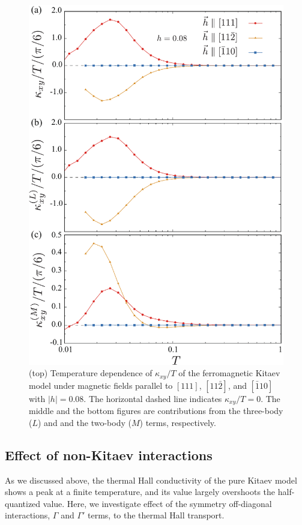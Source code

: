 \documentclass[reprint,amsmath,amssymb,aps,prx]{revtex4-2}
\begin{document}
\begin{figure}
  \begin{center}
    \includegraphics[width=0.9\linewidth]{Figs/plot_k_all_h0.08_ab.pdf}
  \end{center}
  \caption{(top) Temperature dependence of $\kappa_{xy}/T$ of the ferromagnetic Kitaev model under magnetic fields parallel to $[111]$, $[11\bar{2}]$, and $[\bar{1}10]$ with $|h|=0.08$. The horizontal dashed line indicates $\kappa_{xy}/T = 0$. The middle and the bottom figures are contributions from the three-body ($L$) and and the two-body ($M$) terms, respectively.}
  \label{fig:k_all_h0.08_ab}
\end{figure}
  \subsection{Effect of non-Kitaev interactions}
   As we discussed above, the thermal Hall conductivity of the pure Kitaev model shows a peak at a finite temperature, and its value largely overshoots the half-quantized value. Here, we investigate effect of the symmetry off-diagonal interactions, $\Gamma$ and $\Gamma'$ terms, to the thermal Hall transport.
\end{document}
